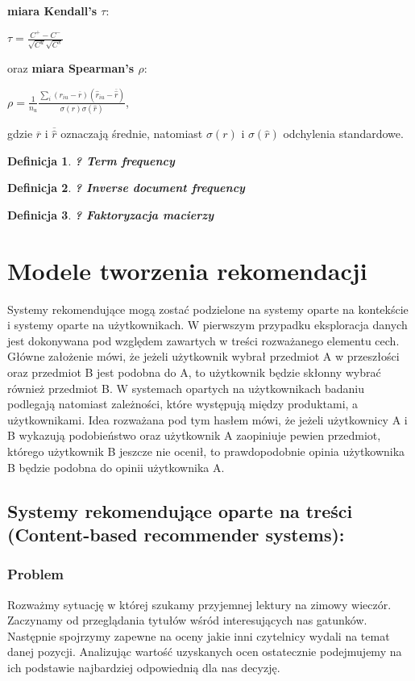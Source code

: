\documentclass[12pt,a4paper]{report}
\newtheorem{df}{Definicja}
\begin{document}
\\\textbf{miara Kendall's $\tau$}:
\begin{center}
$\tau = \frac{C^{+} - C^{-} }{\sqrt{C^{u}}\sqrt{C^{s}}}$
\end{center}
oraz \textbf{miara Spearman's $\rho$}:
\begin{center}
$\rho = \frac{1}{n_{u}}\frac{\sum_i (r_{iu} - \overline{r})(\widehat{r}_{iu}-\overline{\widehat{r}})}{\sigma(r)\sigma(\widehat{r})}$,
\end{center}
gdzie $\overline{r}$ i $\overline{\widehat{r}}$ oznaczają średnie, natomiast $\sigma(r)$ i $\sigma(\widehat{r})$ odchylenia standardowe.
\begin{df}\textbf{? Term frequency}

\end{df}
\begin{df}\textbf{? Inverse document frequency}

\end{df}
\begin{df}\textbf{? Faktoryzacja macierzy}

\end{df}






\chapter{Modele tworzenia rekomendacji}
Systemy rekomendujące mogą zostać podzielone na systemy oparte na kontekście i systemy oparte na użytkownikach. W pierwszym przypadku eksploracja danych jest dokonywana pod względem zawartych w treści rozważanego elementu cech. Główne założenie mówi, że jeżeli użytkownik wybrał przedmiot A w przeszłości oraz przedmiot B jest podobna do A, to użytkownik będzie skłonny wybrać również przedmiot B. W systemach opartych na użytkownikach badaniu podlegają natomiast zależności, które występują między produktami, a użytkownikami. Idea rozważana pod tym hasłem mówi, że jeżeli użytkownicy A i B wykazują podobieństwo oraz użytkownik A zaopiniuje pewien przedmiot, którego użytkownik B jeszcze nie ocenił, to prawdopodobnie opinia użytkownika B będzie podobna do opinii użytkownika A.


\section{Systemy rekomendujące oparte na treści (Content-based recommender systems):}
\subsection{Problem}
Rozważmy sytuację w której szukamy przyjemnej lektury na zimowy wieczór. Zaczynamy od przeglądania tytułów wśród interesujących nas gatunków. Następnie spojrzymy zapewne na oceny jakie inni czytelnicy wydali na temat danej pozycji. Analizując wartość uzyskanych ocen ostatecznie podejmujemy na ich podstawie najbardziej odpowiednią dla nas decyzję. 
\end{document}
